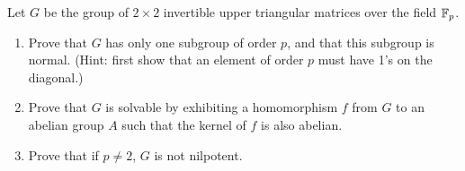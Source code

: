\begin{question}[subtitle = August 2019 Problem 5,ID=Aug19_5]
Let $G$ be the group of $2 \times 2$ invertible upper triangular matrices over the field $\mathbb{F}_p$.
\begin{enumerate}
    \item Prove that $G$ has only one subgroup of order $p$, and that this subgroup is normal. (Hint: first show that an element of order $p$ must have 1's on the diagonal.)
    \item Prove that $G$ is solvable by exhibiting a homomorphism $f$ from $G$ to an abelian group $A$ such that the kernel of $f$ is also abelian.
    \item Prove that if $p \neq 2$, $G$ is not nilpotent.
\end{enumerate}
\end{question}
